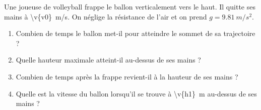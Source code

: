 Une joueuse de volleyball frappe le ballon verticalement vers le haut. Il quitte ses mains à \qty{\v{v0}}{m/s}. On néglige la résistance de l'air et on prend $g = \qty{9.81}{m/s^2}$.

\begin{enumerate}[label=\alph*)]
    \item Combien de temps le ballon met-il pour atteindre le sommet de sa trajectoire ?
    \item Quelle hauteur maximale atteint-il au-dessus de ses mains ?
    \item Combien de temps après la frappe revient-il à la hauteur de ses mains ?
    \item Quelle est la vitesse du ballon lorsqu'il se trouve à \qty{\v{h1}}{m} au-dessus de ses mains ?
\end{enumerate}
